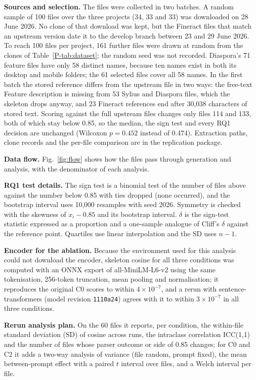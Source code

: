 \textbf{Sources and selection.} The files were collected in two batches. A random sample of 100 files over the three projects (34, 33 and 33) was downloaded on 28 June 2026. No clone of that download was kept, but the Fineract files that match an upstream version date it to the develop branch between 23 and 29 June 2026. To reach 100 files per project, 161 further files were drawn at random from the clones of Table~\ref{P-tab:dataset}; the random seed was not recorded. Diaspora's 71 feature files have only 58 distinct names, because ten names exist in both its desktop and mobile folders; the 61 selected files cover all 58 names. In the first batch the stored reference differs from the upstream file in two ways: the free-text Feature description is missing from 53 Sylius and Diaspora files, which the skeleton drops anyway, and 23 Fineract references end after 30,038 characters of stored text. Scoring against the full upstream files changes only files 114 and 133, both of which stay below 0.85, so the median, the sign test and every RQ1 decision are unchanged (Wilcoxon $p = 0.452$ instead of 0.474). Extraction paths, clone records and the per-file comparison are in the replication package.

\textbf{Data flow.} Fig.~\ref{fig:flow} shows how the files pass through generation and analysis, with the denominator of each analysis.


\textbf{RQ1 test details.} The sign test is a binomial test of the number of files above against the number below 0.85 with ties dropped (none occurred), and the bootstrap interval uses 10,000 resamples with seed 2026. Symmetry is checked with the skewness of $x_i - 0.85$ and its bootstrap interval. $\delta$ is the sign-test statistic expressed as a proportion and a one-sample analogue of Cliff's $\delta$ against the reference point. Quartiles use linear interpolation and the SD uses $n - 1$.

\textbf{Encoder for the ablation.} Because the environment used for this analysis could not download the encoder, skeleton cosine for all three conditions was computed with an ONNX export of all-MiniLM-L6-v2 using the same tokenisation, 256-token truncation, mean pooling and normalisation; it reproduces the original C0 scores to within $4 \times 10^{-7}$, and a rerun with sentence-transformers (model revision \texttt{1110a24}) agrees with it to within $3 \times 10^{-7}$ in all three conditions.

\textbf{Rerun analysis plan.} On the 60 files it reports, per condition, the within-file standard deviation (SD) of cosine across runs, the intraclass correlation ICC(1,1) and the number of files whose parser outcome or side of 0.85 changes; for C0 and C2 it adds a two-way analysis of variance (file random, prompt fixed), the mean between-prompt effect with a paired $t$ interval over files, and a Welch interval per file.


